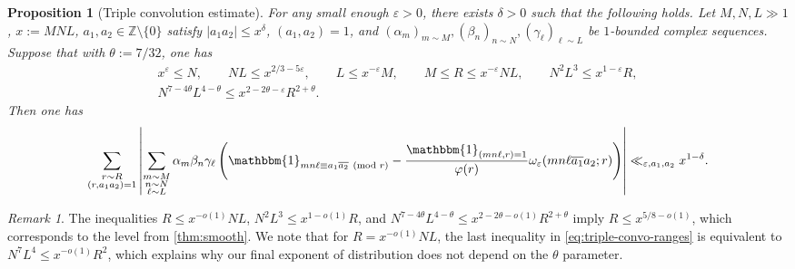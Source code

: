 \documentclass[reqno,11pt]{amsart}
\newtheorem{proposition}[theorem]{Proposition}
\theoremstyle{remark}
\newtheorem*{remark}{Remark}
\numberwithin{equation}{section}
\newcommand{\Z}{\mathbb{Z}}
\newcommand{\one}{\mathbbm{1}}
\newcommand{\eps}{\varepsilon}
\renewcommand{\bar}{\overline}
\renewcommand{\pmod}[1]{\ (\textnormal{mod } #1)}
\begin{document}
\begin{proposition}[Triple convolution estimate] \label{prop:triple-convo}
For any small enough $\eps > 0$, there exists $\delta > 0$ such that the following holds. Let $M, N, L \gg 1$, $x := MNL$, $a_1, a_2 \in \Z \setminus \{0\}$ satisfy $|a_1a_2| \le x^\delta$, $(a_1, a_2) = 1$, and $(\alpha_m)_{m \sim M}, (\beta_n)_{n \sim N}, (\gamma_\ell)_{\ell\sim L}$ be $1$-bounded complex sequences. Suppose that with $\theta := 7/32$, one has
\begin{equation} \label{eq:triple-convo-ranges}
\begin{gathered}
    x^\eps \le N, \qquad 
    NL \le x^{2/3-5\eps}, \qquad 
    L \le x^{-\eps} M, \qquad
    M \le R \le x^{-\eps} NL, \qquad 
    N^2 L^3 \le x^{1-\eps} R,
    \\
    N^{7-4\theta} L^{4-\theta} \le x^{2-2\theta-\eps} R^{2+\theta}.
\end{gathered}
\end{equation}
Then one has
\[
    \sum_{\substack{r \sim R \\ (r, a_1 a_2) = 1}} 
    \left\vert \sum_{\substack{m \sim M \\ n \sim N \\ \ell \sim L}} \alpha_m  \beta_n 
    \gamma_\ell 
    \left(\one_{mn\ell \equiv a_1 \bar{a_2} \pmod{r}} - \frac{\one_{(mn\ell, r) = 1}}{\varphi(r)} \omega_\eps(mn\ell \bar{a_1} a_2; r) \right)
    \right\vert
    \ll_{\eps,a_1,a_2} x^{1-\delta}.
\]
\end{proposition}

\begin{remark}
The inequalities $R \le x^{-o(1)} NL$, $N^2 L^3 \le x^{1-o(1)} R$, and $N^{7-4\theta} L^{4-\theta} \le x^{2-2\theta-o(1)} R^{2+\theta}$ imply $R \le x^{5/8 - o(1)}$, which corresponds to the level from \cref{thm:smooth}. We note that for $R = x^{-o(1)} NL$, the last inequality in \cref{eq:triple-convo-ranges} is equivalent to $N^7 L^4 \le x^{-o(1)} R^2$, which explains why our final exponent of distribution does not depend on the $\theta$ parameter.
\end{remark}
\end{document}
